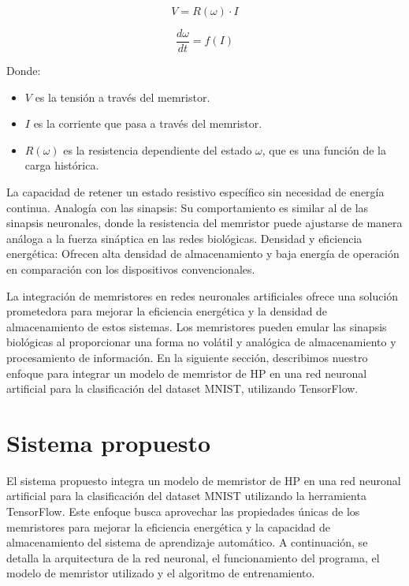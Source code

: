 \documentclass[conference]{IEEEtran}
\begin{document}
\begin{equation}
	V = R(\omega) \cdot I
	\label{eq:2}
\end{equation}

\begin{equation}
	\frac{d\omega}{dt} = f(I)
	\label{eq:3}
\end{equation}

Donde:
\begin{itemize}
	\item $V$ es la tensión a través del memristor.
	\item $I$ es la corriente que pasa a través del memristor.
	\item $R(\omega)$ es la resistencia dependiente del estado $\omega$, que es una función de la carga histórica.
\end{itemize}

La capacidad de retener un estado resistivo específico sin necesidad de energía continua.
Analogía con las sinapsis: Su comportamiento es similar al de las sinapsis neuronales, donde la resistencia del memristor puede ajustarse de manera análoga a la fuerza sináptica en las redes biológicas.
Densidad y eficiencia energética: Ofrecen alta densidad de almacenamiento y baja energía de operación en comparación con los dispositivos convencionales.

La integración de memristores en redes neuronales artificiales ofrece una solución prometedora para mejorar la eficiencia energética y la densidad de almacenamiento de estos sistemas. Los memristores pueden emular las sinapsis biológicas al proporcionar una forma no volátil y analógica de almacenamiento y procesamiento de información. En la siguiente sección, describimos nuestro enfoque para integrar un modelo de memristor de HP en una red neuronal artificial para la clasificación del dataset MNIST, utilizando TensorFlow.

\section{Sistema propuesto}

El sistema propuesto integra un modelo de memristor de HP en una red neuronal artificial para la clasificación del dataset MNIST utilizando la herramienta TensorFlow. Este enfoque busca aprovechar las propiedades únicas de los memristores para mejorar la eficiencia energética y la capacidad de almacenamiento del sistema de aprendizaje automático. A continuación, se detalla la arquitectura de la red neuronal, el funcionamiento del programa, el modelo de memristor utilizado y el algoritmo de entrenamiento.
\end{document}
